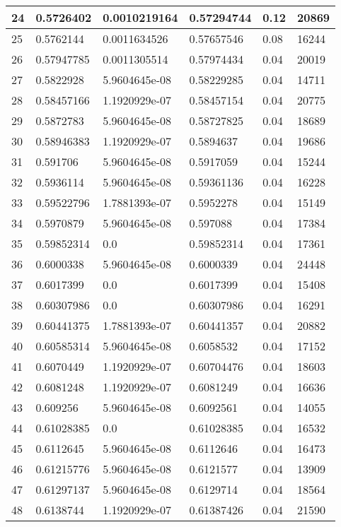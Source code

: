 \begin{longtable}{|l|l|l|l|l|l|}
24 & 0.5726402 & 0.0010219164 & 0.57294744 & 0.12 & 20869 \\ \hline 
25 & 0.5762144 & 0.0011634526 & 0.57657546 & 0.08 & 16244 \\ \hline 
26 & 0.57947785 & 0.0011305514 & 0.57974434 & 0.04 & 20019 \\ \hline 
27 & 0.5822928 & 5.9604645e-08 & 0.58229285 & 0.04 & 14711 \\ \hline 
28 & 0.58457166 & 1.1920929e-07 & 0.58457154 & 0.04 & 20775 \\ \hline 
29 & 0.5872783 & 5.9604645e-08 & 0.58727825 & 0.04 & 18689 \\ \hline 
30 & 0.58946383 & 1.1920929e-07 & 0.5894637 & 0.04 & 19686 \\ \hline 
31 & 0.591706 & 5.9604645e-08 & 0.5917059 & 0.04 & 15244 \\ \hline 
32 & 0.5936114 & 5.9604645e-08 & 0.59361136 & 0.04 & 16228 \\ \hline 
33 & 0.59522796 & 1.7881393e-07 & 0.5952278 & 0.04 & 15149 \\ \hline 
34 & 0.5970879 & 5.9604645e-08 & 0.597088 & 0.04 & 17384 \\ \hline 
35 & 0.59852314 & 0.0 & 0.59852314 & 0.04 & 17361 \\ \hline 
36 & 0.6000338 & 5.9604645e-08 & 0.6000339 & 0.04 & 24448 \\ \hline 
37 & 0.6017399 & 0.0 & 0.6017399 & 0.04 & 15408 \\ \hline 
38 & 0.60307986 & 0.0 & 0.60307986 & 0.04 & 16291 \\ \hline 
39 & 0.60441375 & 1.7881393e-07 & 0.60441357 & 0.04 & 20882 \\ \hline 
40 & 0.60585314 & 5.9604645e-08 & 0.6058532 & 0.04 & 17152 \\ \hline 
41 & 0.6070449 & 1.1920929e-07 & 0.60704476 & 0.04 & 18603 \\ \hline 
42 & 0.6081248 & 1.1920929e-07 & 0.6081249 & 0.04 & 16636 \\ \hline 
43 & 0.609256 & 5.9604645e-08 & 0.6092561 & 0.04 & 14055 \\ \hline 
44 & 0.61028385 & 0.0 & 0.61028385 & 0.04 & 16532 \\ \hline 
45 & 0.6112645 & 5.9604645e-08 & 0.6112646 & 0.04 & 16473 \\ \hline 
46 & 0.61215776 & 5.9604645e-08 & 0.6121577 & 0.04 & 13909 \\ \hline 
47 & 0.61297137 & 5.9604645e-08 & 0.6129714 & 0.04 & 18564 \\ \hline 
48 & 0.6138744 & 1.1920929e-07 & 0.61387426 & 0.04 & 21590 \\ \hline 

\end{longtable}

